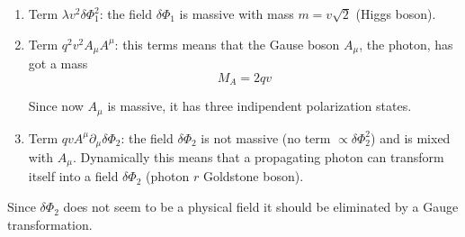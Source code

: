 \documentclass[../main/main.tex]{subfiles}
\begin{document}
\begin{enumerate}
\item Term \( \lambda v^2 \delta \Phi _1^2 \): the field \( \delta \Phi _1 \) is massive with mass \( m= v \sqrt{2 \label{} }  \)  (Higgs boson).
\item Term \( q^2 v^2 A_ \mu A ^\mu  \): this terms means that the Gause boson \( A _ \mu  \), the photon, has got a mass
\begin{equation}
  M_A = 2 q v
\end{equation}
\begin{remark}
Since now \( A _ \mu  \) is massive, it has three indipendent polarization states.
\end{remark}

\item Term \( q v A ^ \mu  \partial _ \mu  \delta \Phi _2  \): the field \( \delta \Phi _2 \) is not massive (no term \( \propto \delta \Phi _2^2 \)) and is mixed with \( A_ \mu  \). Dynamically this means that a propagating photon can transform itself into a field \( \delta \Phi _2 \) (photon \( r \) Goldstone boson).
\end{enumerate}
Since \( \delta \Phi _2 \) does not seem to be a physical field it should be eliminated by a Gauge transformation.
\end{document}

